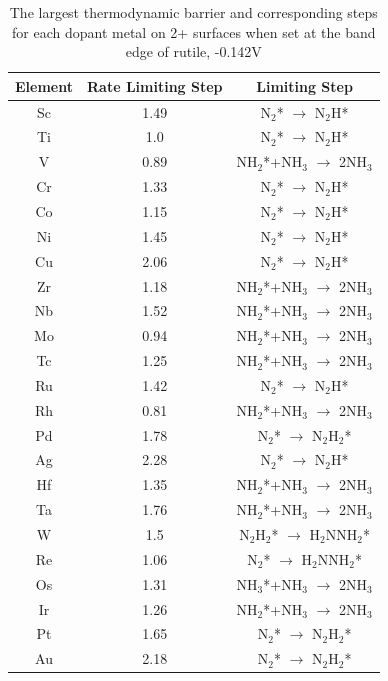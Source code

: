 \documentclass[journal=jacsat,manuscript=article]{achemso}
\begin{document}
\begin{table}
\begin{center}
\begin{tabular}{| c | c |c |}
\hline
Element & Rate Limiting Step & Limiting Step \\
\hline
Sc & 1.49 & N$_2$* $\rightarrow$ N$_2$H*\\
Ti & 1.0 & N$_2$* $\rightarrow$ N$_2$H*\\
V & 0.89 & NH$_2$*+NH$_3$ $\rightarrow$ 2NH$_3$\\
Cr & 1.33 & N$_2$* $\rightarrow$ N$_2$H*\\
Co & 1.15 & N$_2$* $\rightarrow$ N$_2$H*\\
Ni & 1.45 & N$_2$* $\rightarrow$ N$_2$H*\\
Cu & 2.06 & N$_2$* $\rightarrow$ N$_2$H*\\
Zr & 1.18 & NH$_2$*+NH$_3$ $\rightarrow$ 2NH$_3$\\
Nb & 1.52 & NH$_2$*+NH$_3$ $\rightarrow$ 2NH$_3$\\
Mo & 0.94 & NH$_2$*+NH$_3$ $\rightarrow$ 2NH$_3$\\
Tc & 1.25 & NH$_2$*+NH$_3$ $\rightarrow$ 2NH$_3$\\
Ru & 1.42 & N$_2$* $\rightarrow$ N$_2$H*\\
Rh & 0.81 & NH$_2$*+NH$_3$ $\rightarrow$ 2NH$_3$\\
Pd & 1.78 & N$_2$* $\rightarrow$ N$_2$H$_2$*\\
Ag & 2.28 & N$_2$* $\rightarrow$ N$_2$H*\\
Hf & 1.35 & NH$_2$*+NH$_3$ $\rightarrow$ 2NH$_3$\\
Ta & 1.76 & NH$_2$*+NH$_3$ $\rightarrow$ 2NH$_3$\\
W & 1.5 & N$_2$H$_2$* $\rightarrow$ H$_2$NNH$_2$*\\
Re & 1.06 & N$_2$* $\rightarrow$ H$_2$NNH$_2$*\\
Os & 1.31 & NH$_3$*+NH$_3$ $\rightarrow$ 2NH$_3$\\
Ir & 1.26 & NH$_2$*+NH$_3$ $\rightarrow$ 2NH$_3$\\
Pt & 1.65 & N$_2$* $\rightarrow$ N$_2$H$_2$*\\
Au & 2.18 & N$_2$* $\rightarrow$ N$_2$H$_2$*\\
\hline
\end{tabular}
\end{center}
\caption{The largest thermodynamic barrier and corresponding steps for each dopant metal on 2+ surfaces when set at the band edge of rutile, -0.142V}\label{table:rate_limiting_steps}\end{table}\begin{figure}

\end{figure}
\end{document}
